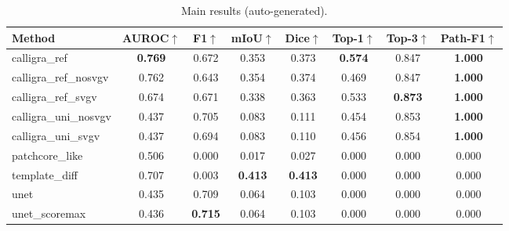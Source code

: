 
\begin{table}[t]
\centering
\small
\begin{tabular}{@{}lccccccc@{}}
\toprule
Method & AUROC$\uparrow$ & F1$\uparrow$ & mIoU$\uparrow$ & Dice$\uparrow$ & Top-1$\uparrow$ & Top-3$\uparrow$ & Path-F1$\uparrow$ \\
\midrule
calligra\_ref & \textbf{0.769} & 0.672 & 0.353 & 0.373 & \textbf{0.574} & 0.847 & \textbf{1.000} \\
calligra\_ref\_nosvgv & 0.762 & 0.643 & 0.354 & 0.374 & 0.469 & 0.847 & \textbf{1.000} \\
calligra\_ref\_svgv & 0.674 & 0.671 & 0.338 & 0.363 & 0.533 & \textbf{0.873} & \textbf{1.000} \\
calligra\_uni\_nosvgv & 0.437 & 0.705 & 0.083 & 0.111 & 0.454 & 0.853 & \textbf{1.000} \\
calligra\_uni\_svgv & 0.437 & 0.694 & 0.083 & 0.110 & 0.456 & 0.854 & \textbf{1.000} \\
patchcore\_like & 0.506 & 0.000 & 0.017 & 0.027 & 0.000 & 0.000 & 0.000 \\
template\_diff & 0.707 & 0.003 & \textbf{0.413} & \textbf{0.413} & 0.000 & 0.000 & 0.000 \\
unet & 0.435 & 0.709 & 0.064 & 0.103 & 0.000 & 0.000 & 0.000 \\
unet\_scoremax & 0.436 & \textbf{0.715} & 0.064 & 0.103 & 0.000 & 0.000 & 0.000 \\
\bottomrule
\end{tabular}
\caption{Main results (auto-generated).}
\label{tab:main_results_auto}
\end{table}
